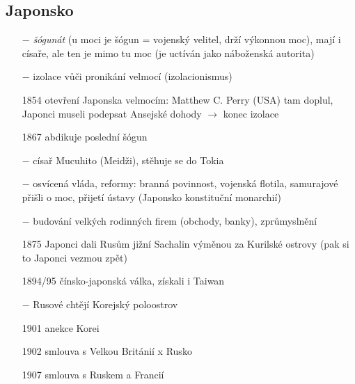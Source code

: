 \documentclass{article}
\begin{document}
\subsection*{Japonsko}
\begin{itemize}
    \vspace{-0.5em}
    \setlength\itemsep{0.15em}
    \item[$-$] \textit{šógunát}  (u moci je šógun = vojenský velitel, drží výkonnou moc), mají i císaře, ale ten je mimo tu moc (je uctíván jako náboženská autorita)
    \item[$-$] izolace vůči pronikání velmocí (izolacionismus)
    \item[1854] otevření Japonska velmocím: Matthew C. Perry (USA) tam doplul, Japonci museli podepsat Ansejské dohody $\rightarrow$  konec izolace
    \item[1867]  abdikuje poslední šógun
    \item[$-$] císař Mucuhito (Meidži), stěhuje se do Tokia
    \item[$-$] osvícená vláda, reformy: branná povinnost, vojenská flotila, samurajové přišli o moc, přijetí ústavy (Japonsko konstituční monarchií)
    \item[$-$] budování velkých rodinných firem (obchody, banky), zprůmyslnění
    \item[1875]  Japonci dali Rusům jižní Sachalin výměnou za Kurilské ostrovy (pak si to Japonci vezmou zpět)
    \item[1894/95]  čínsko-japonská válka, získali i Taiwan
    \item[$-$] Rusové chtějí Korejský poloostrov
    \item[1901]  anekce Korei
    \item[1902]  smlouva s Velkou Británií x Rusko
    \item[1907]  smlouva s Ruskem a Francií
\end{itemize}
\end{document}
